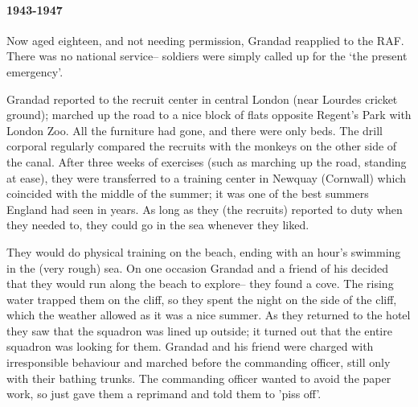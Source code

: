 \documentclass[11pt]{article}
\begin{document}
\paragraph{1943-1947} Now aged eighteen, and not needing permission, Grandad reapplied to the RAF. 
There was no national service-- soldiers were simply called up for the `the present 
emergency'.
\begin{figure}
  \centering
\end{figure}
Grandad reported to the recruit center in central London (near Lourdes cricket ground); 
marched up the road to a nice block of flats opposite Regent's Park with London Zoo. 
All the furniture had gone, and there were only beds.
The drill corporal regularly compared the recruits with the monkeys on the other side of the canal. 
After three weeks of exercises (such as marching up the road, standing at ease), they were transferred to a training 
center in Newquay (Cornwall) which coincided with the middle of the summer; it was 
one of the best summers England had seen in years. As long as they (the recruits) reported to duty when they needed to,
they could go in the sea whenever they liked.

They would do physical training on the beach, ending with an hour's swimming in the (very rough) sea.
On one occasion Grandad and a friend of his decided that they would run along the beach to explore-- they found a 
cove. The rising water trapped them on the cliff,  so they spent the night on the side of the cliff, which the 
weather allowed as it was a nice summer.  As they returned to the hotel they saw that the squadron was lined up outside;
it turned out that the entire squadron was looking for them. Grandad and his friend 
were charged with irresponsible behaviour and marched before the commanding officer, still 
only with their bathing trunks. The commanding officer wanted to avoid the paper work, so just 
gave them a reprimand and told them to 'piss off'.
\end{document}
